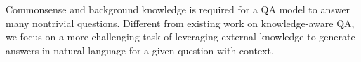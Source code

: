 Commonsense and background knowledge is required for a QA model to answer many nontrivial questions. Different from existing work on knowledge-aware QA, we focus on a more challenging task of leveraging external knowledge to generate answers in natural language for a given question with context.